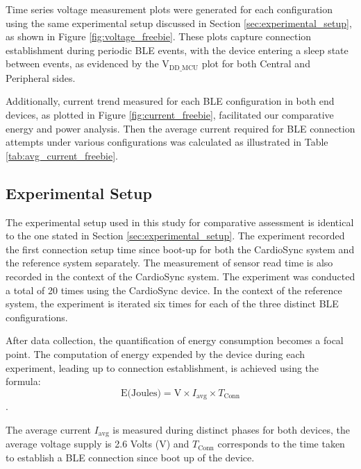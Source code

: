 \noindent Time series voltage measurement plots were generated for each configuration using the same experimental setup discussed in Section \ref{sec:experimental_setup}, as shown in Figure \ref{fig:voltage_freebie}. These plots capture connection establishment during periodic BLE events, with the device entering a sleep state between events, as evidenced by the \(\text{V}_\text{DD\_MCU}\) plot for both Central and Peripheral sides.
\vspace{1\baselineskip}

\noindent Additionally, current trend measured for each BLE configuration in both end devices, as plotted in Figure \ref{fig:current_freebie}, facilitated our comparative energy and power analysis. Then the average current required for BLE connection attempts under various configurations was calculated as illustrated in Table \ref{tab:avg_current_freebie}. 

\subsection{Experimental Setup}
The experimental setup used in this study for comparative assessment is identical to the one stated in Section \ref{sec:experimental_setup}. The experiment recorded the first connection setup time since boot-up for both the CardioSync system and the reference system separately. The measurement of sensor read time is also recorded in the context of the CardioSync system. The experiment was conducted a total of 20 times using the CardioSync device. In the context of the reference system, the experiment is iterated six times for each of the three distinct BLE configurations.
\vspace{1\baselineskip}

\noindent After data collection, the quantification of energy consumption becomes a focal point. The computation of energy expended by the device during each experiment, leading up to connection establishment, is achieved using the formula: \[\text{E(Joules)} = \text{V} \times I_\text{avg} \times T_{\text{Conn}}\].

\noindent The average current $I_\text{avg}$ is measured during distinct phases for both devices, the average voltage supply is 2.6 Volts ($\text{V}$) and $T_\text{Conn}$ corresponds to the time taken to establish a BLE connection since boot up of the device. 
\vspace{1\baselineskip}


